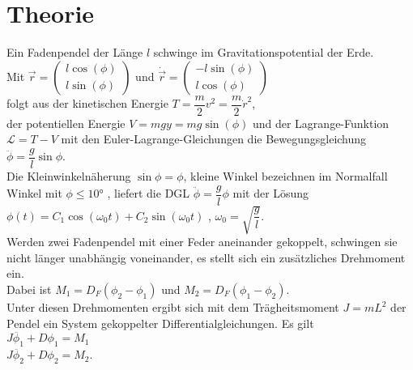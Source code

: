 \section{Theorie}
\label{sec:Theorie}
Ein Fadenpendel der Länge $l$ schwinge im Gravitationspotential der Erde. \\ 

\noindent Mit $\vec{r} = \left(\begin{array}{c} l \cos(\phi) \\ l \sin(\phi) \end{array} \right)$ und $\dot{\vec{r}} =\left(\begin{array}{c} -l \sin(\phi) \\ l \cos(\phi) \end{array} \right)$ \\

\noindent folgt aus der kinetischen Energie $T = \dfrac{m}{2} v^2 = \dfrac{m}{2} \dot{r}^2$, \\
der potentiellen Energie $V = mgy = mg\sin(\phi)$ und der Lagrange-Funktion $\mathscr{L} = T - V$ mit den Euler-Lagrange-Gleichungen die Bewegungsgleichung \\

\noindent $\ddot{\phi} = \dfrac{g}{l}\sin{\phi}$. \\

Die Kleinwinkelnäherung $\sin{\phi}=\phi$, kleine Winkel bezeichnen im Normalfall Winkel mit $\phi \leq 10°$ \cite{wiki:xxx}, liefert die DGL $\ddot{\phi} = \dfrac{g}{l}\phi$ mit der Lösung \\ 
$\phi(t) = C_1 \cos(\omega_0t) + C_2 \sin(\omega_0t)$ , $\omega_0=\sqrt{\dfrac{g}{l}}$. \\

Werden zwei Fadenpendel mit einer Feder aneinander gekoppelt, schwingen sie nicht länger unabhängig voneinander, es stellt sich ein zusätzliches Drehmoment ein. \\

\noindent Dabei ist $M_1=D_F(\phi_2-\phi_1)$ und $M_2=D_F(\phi_1-\phi_2)$. \\

Unter diesen Drehmomenten ergibt sich mit dem Trägheitsmoment $J=mL^2$ der Pendel ein System gekoppelter Differentialgleichungen. Es gilt\\

\noindent $J\ddot{\phi_1} + D\phi_1 = M_1$ \\

\noindent $J\ddot{\phi_2} + D\phi_2 = M_2$. \\

